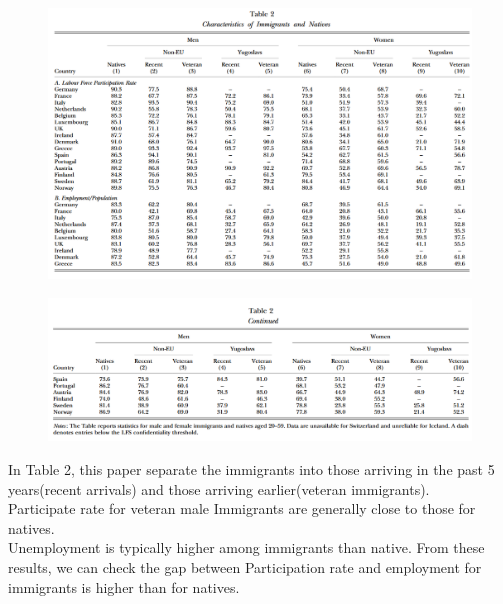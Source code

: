 \documentclass[../root]{subfiles}
\begin{document}
    \begin{figure}[h]
        \includegraphics[width=15cm]{0529sugiyama/Table2.png}
    \end{figure}
    \begin{figure}[h]
        \includegraphics[width=15cm]{0529sugiyama/Table2(cont).png}
    \end{figure}

    In Table 2, this paper separate the immigrants into those arriving in the past 5 years(recent arrivals) and those arriving earlier(veteran immigrants). \\
    Participate rate for veteran male Immigrants are generally close to those for natives. \\
    Unemployment is typically higher among immigrants than native. From these results, we can check the gap between Participation rate and employment for immigrants is higher than for natives.
    
    
\end{document}
